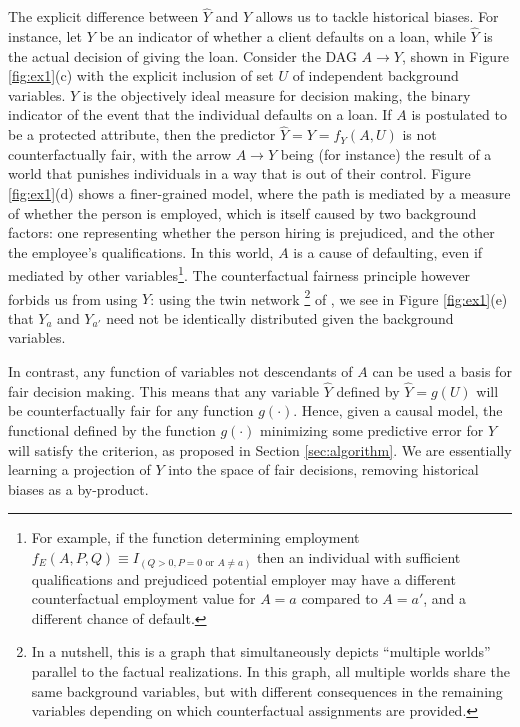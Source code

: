  The explicit difference between $\hat Y$ and $Y$
allows us to tackle historical biases. For instance, let $Y$ be an
indicator of whether a client defaults on a loan, while $\hat Y$ is
the actual decision of giving the loan. Consider the DAG $A
\rightarrow Y$, shown in Figure \ref{fig:ex1}(c) with the explicit
inclusion of set $U$ of independent background variables. $Y$ is the
objectively ideal measure for decision making, the binary indicator of
the event that the individual defaults on a loan. If $A$ is postulated
to be a protected attribute, then the predictor $\hat Y = Y = f_Y(A,
U)$ is not counterfactually fair, with the arrow $A \rightarrow Y$
being (for instance) the result of a world that punishes individuals
in a way that is out of their control. Figure \ref{fig:ex1}(d) shows a
finer-grained model, where the path is mediated by a measure of
whether the person is employed, which is itself caused by two
background factors: one representing whether the person hiring is
prejudiced, and the other the employee's qualifications. In this
world, $A$ is a cause of defaulting, even if mediated by other
variables\footnote{For example, if the function determining employment
  $f_E(A,P,Q) \equiv I_{(Q > 0, P = 0 \text{ or } A \neq a)}$ then an
  individual with sufficient qualifications and prejudiced potential
  employer may have a different counterfactual employment value for $A
  = a$ compared to $A = a'$, and a different chance of default. }. The
counterfactual fairness principle however forbids us from using $Y$:
using the twin network
\footnote{In a nutshell, this is a graph that simultaneously depicts
  ``multiple worlds'' parallel to the factual realizations. In
  this graph, all multiple worlds share the same background variables,
  but with different consequences in the remaining variables depending
  on which counterfactual assignments are provided.} of
\citet{pearl:00}, we see in Figure \ref{fig:ex1}(e) that $Y_a$ and
$Y_{a'}$ need not be identically distributed given the background
variables.

In contrast, any function of variables not descendants of $A$ can be
used a basis for fair decision making. This means that any variable
$\hat Y$ defined by $\hat Y = g(U)$ will be counterfactually fair for
any function $g(\cdot)$. Hence, given a causal model, the functional
defined by the function $g(\cdot)$ minimizing some predictive error
for $Y$ will satisfy the criterion, as proposed in Section
\ref{sec:algorithm}. We are essentially learning a projection of $Y$
into the space of fair decisions, removing historical biases as a
by-product.

